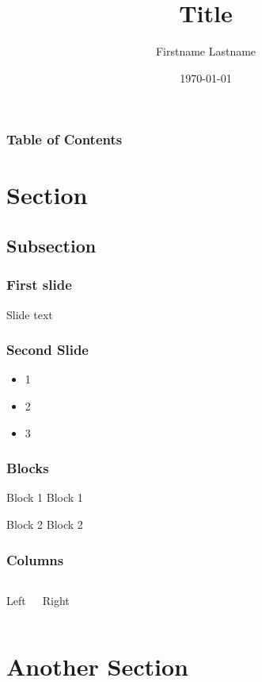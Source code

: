\documentclass{beamer}
\title[Short title]{Title}
\author{Firstname Lastname}
\institute[Institution]
{
	RWTH Aachen \\
	\medskip
	\textit{mail@mail.com}
}
\date{\today}
\begin{document}
\begin{frame}
\titlepage
\end{frame}

\begin{frame}
\frametitle{Table of Contents}
\tableofcontents
\end{frame}


\section{Section}

\subsection{Subsection}

\begin{frame}
\frametitle{First slide}
Slide text
\end{frame}


\begin{frame}
\frametitle{Second Slide}
\begin{itemize}
\item 1
\item 2
\item 3
\end{itemize}
\end{frame}

\begin{frame}
\frametitle{Blocks}
\begin{block}{Block 1}
Block 1
\end{block}

\begin{block}{Block 2}
Block 2
\end{block}
\end{frame}

\begin{frame}
\frametitle{Columns}
\begin{columns}[c]

Left

Right

\end{columns}
\end{frame}


\section{Another Section}
\end{document}
